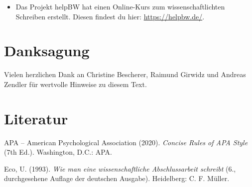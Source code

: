 \documentclass{../cssheet}
\begin{document}
\begin{itemize}
\item Das Projekt helpBW hat einen Online-Kurs zum wissenschaftlichten Schreiben erstellt. Diesen findest du hier: \url{https://helpbw.de/}.
\end{itemize}

\section{Danksagung}

Vielen herzlichen Dank an Christine Bescherer, Raimund Girwidz und
Andreas Zendler für wertvolle Hinweise zu diesem Text.

\section{Literatur}

APA -- American Psychological Association (2020). \emph{Concise Rules of APA Style} (7th Ed.). Washington, D.C.: APA.

Eco, U. (1993). \emph{Wie man eine wissenschaftliche Abschlussarbeit schreibt} (6., durchgesehene Auflage der deutschen Ausgabe). Heidelberg: C. F.
Müller.

\vspace*{10mm}

\printlicense

\printsocials
\end{document}
